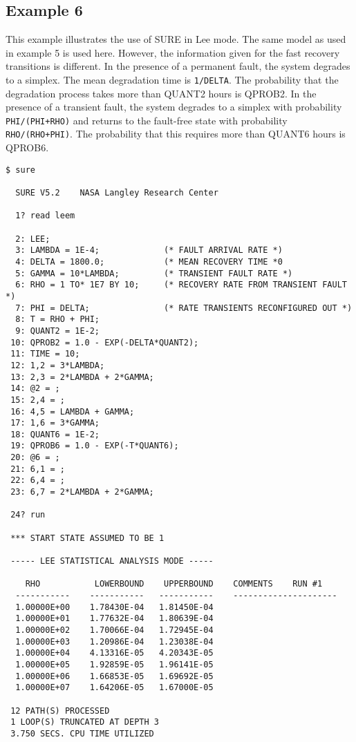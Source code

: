 \subsection{Example 6 }

This example illustrates the use of SURE in Lee mode.  The same model as used
in example 5 is used here.  However, the information given for the fast
recovery transitions is different.  In the presence of a permanent fault, the
system degrades to a simplex.  The mean degradation time is \verb|1/DELTA|.
The probability that the degradation process takes more than {\isf QUANT2}
hours is {\isf QPROB2.}  In the presence of a transient fault, the system
degrades to a simplex with probability \verb|PHI/(PHI+RHO)| and returns to the
fault-free state with probability \verb|RHO/(RHO+PHI)|.  The probability that
this requires more than {\isf QUANT6} hours is {\isf QPROB6}.
\begin{verbatim}
$ sure

  SURE V5.2    NASA Langley Research Center

  1? read leem

  2: LEE;
  3: LAMBDA = 1E-4;             (* FAULT ARRIVAL RATE *)
  4: DELTA = 1800.0;            (* MEAN RECOVERY TIME *0
  5: GAMMA = 10*LAMBDA;         (* TRANSIENT FAULT RATE *)
  6: RHO = 1 TO* 1E7 BY 10;     (* RECOVERY RATE FROM TRANSIENT FAULT *)
  7: PHI = DELTA;               (* RATE TRANSIENTS RECONFIGURED OUT *)
  8: T = RHO + PHI;
  9: QUANT2 = 1E-2;
 10: QPROB2 = 1.0 - EXP(-DELTA*QUANT2);
 11: TIME = 10;
 12: 1,2 = 3*LAMBDA;
 13: 2,3 = 2*LAMBDA + 2*GAMMA;
 14: @2 = ;
 15: 2,4 = ;
 16: 4,5 = LAMBDA + GAMMA;
 17: 1,6 = 3*GAMMA;
 18: QUANT6 = 1E-2;
 19: QPROB6 = 1.0 - EXP(-T*QUANT6);
 20: @6 = ;
 21: 6,1 = ;
 22: 6,4 = ;
 23: 6,7 = 2*LAMBDA + 2*GAMMA;

 24? run

 *** START STATE ASSUMED TO BE 1

 ----- LEE STATISTICAL ANALYSIS MODE -----
 
    RHO           LOWERBOUND    UPPERBOUND    COMMENTS    RUN #1
  -----------    -----------   -----------    ---------------------
  1.00000E+00    1.78430E-04   1.81450E-04
  1.00000E+01    1.77632E-04   1.80639E-04
  1.00000E+02    1.70066E-04   1.72945E-04
  1.00000E+03    1.20986E-04   1.23038E-04
  1.00000E+04    4.13316E-05   4.20343E-05
  1.00000E+05    1.92859E-05   1.96141E-05
  1.00000E+06    1.66853E-05   1.69692E-05
  1.00000E+07    1.64206E-05   1.67000E-05

 12 PATH(S) PROCESSED
 1 LOOP(S) TRUNCATED AT DEPTH 3
 3.750 SECS. CPU TIME UTILIZED
\end{verbatim}

